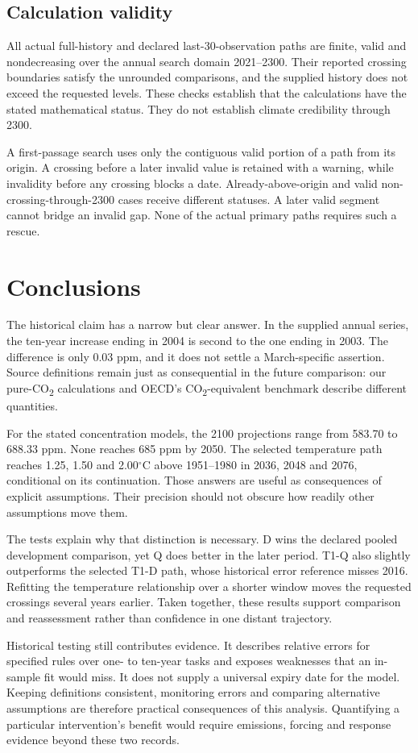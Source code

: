 \documentclass[11pt,a4paper]{article}
\newcommand{\p}[2]{#2\par}
\newcommand{\CO}{CO\textsubscript{2}}
\newcommand{\degC}{\ensuremath{{}^{\circ}\mathrm{C}}}
\begin{document}
\subsection{Calculation validity}
\p{APP03}{All actual full-history and declared last-30-observation paths are finite, valid and nondecreasing over the annual search domain 2021--2300. Their reported crossing boundaries satisfy the unrounded comparisons, and the supplied history does not exceed the requested levels. These checks establish that the calculations have the stated mathematical status. They do not establish climate credibility through 2300.}
\p{APP04}{A first-passage search uses only the contiguous valid portion of a path from its origin. A crossing before a later invalid value is retained with a warning, while invalidity before any crossing blocks a date. Already-above-origin and valid non-crossing-through-2300 cases receive different statuses. A later valid segment cannot bridge an invalid gap. None of the actual primary paths requires such a rescue.}
\section{Conclusions}\label{sec:conclusion}
\p{CON01}{The historical claim has a narrow but clear answer. In the supplied annual series, the ten-year increase ending in 2004 is second to the one ending in 2003. The difference is only 0.03 ppm, and it does not settle a March-specific assertion. Source definitions remain just as consequential in the future comparison: our pure-\CO{} calculations and OECD's \CO{}-equivalent benchmark describe different quantities.}
\p{CON02}{For the stated concentration models, the 2100 projections range from 583.70 to 688.33 ppm. None reaches 685 ppm by 2050. The selected temperature path reaches 1.25, 1.50 and 2.00\degC{} above 1951--1980 in 2036, 2048 and 2076, conditional on its continuation. Those answers are useful as consequences of explicit assumptions. Their precision should not obscure how readily other assumptions move them.}
\p{CON03}{The tests explain why that distinction is necessary. D wins the declared pooled development comparison, yet Q does better in the later period. T1-Q also slightly outperforms the selected T1-D path, whose historical error reference misses 2016. Refitting the temperature relationship over a shorter window moves the requested crossings several years earlier. Taken together, these results support comparison and reassessment rather than confidence in one distant trajectory.}
\p{CON04}{Historical testing still contributes evidence. It describes relative errors for specified rules over one- to ten-year tasks and exposes weaknesses that an in-sample fit would miss. It does not supply a universal expiry date for the model. Keeping definitions consistent, monitoring errors and comparing alternative assumptions are therefore practical consequences of this analysis. Quantifying a particular intervention's benefit would require emissions, forcing and response evidence beyond these two records.}
\clearpage
\end{document}
